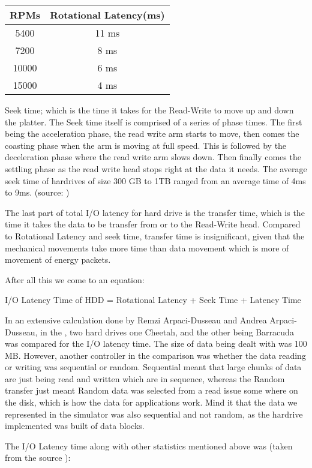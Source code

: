 \documentclass[12pt]{article}
\begin{document}
\begin{tabular}{|c|c|}
  \hline
  RPMs & Rotational Latency(ms)\\
  \hline
  5400 & 11 ms\\
  \hline
  7200 & 8 ms\\
  \hline
  10000 & 6 ms\\
  \hline
  15000 & 4 ms\\
  \hline
\end {tabular}

Seek time; which is the time it takes for the Read-Write to move up and down the platter.
The Seek time itself is comprised of a series of phase times. The first being the acceleration phase,
the read write arm starts to move, then comes the coasting phase when the arm is moving at full speed. This
is followed by the deceleration phase where the read write arm slows down. Then finally comes the
settling phase as the read write head stops right at the data it needs.
The average seek time of hardrives of size 300 GB to 1TB ranged from an average time of 4ms to 9ms.
(source: \cite{tbree} )

The last part of total I/O latency for hard drive is the transfer time, which is the time it takes the
data to be transfer from or to the Read-Write head. Compared to Rotational Latency and seek time, transfer
time is insignificant, given that the mechanical movements take more time than data movement which is more of
movement of energy packets.

After all this we come to an equation:

I/O Latency Time of HDD = Rotational Latency + Seek Time + Latency Time 

In an extensive calculation done by Remzi Arpaci-Dusseau and Andrea Arpaci-Dusseau, in the \cite{tbree},
two hard drives one Cheetah, and the other being Barracuda was compared for the I/O latency time. The size of
data being dealt with was 100 MB. However, another controller in the comparison was whether the data reading or writing
was sequential or random. Sequential meant that large chunks of data are just being read and written which are in
sequence, whereas the Random transfer just meant Random data was selected from a read issue some where on the disk,
which is how the data for applications work. Mind it that the data we represented in the simulator was also sequential
and not random, as the hardrive implemented was built of data blocks.

The I/O Latency time along with other statistics mentioned above was (taken from the source \cite{tbree}): 
\end{document}
